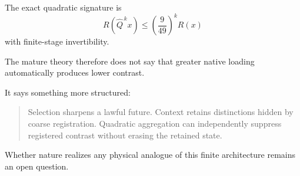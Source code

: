 The exact quadratic signature is
\[
R(\widehat Q^{\,k}x)
\le
\left(\frac9{49}\right)^kR(x)
\]
with finite-stage invertibility.

The mature theory therefore does not say that greater native loading
automatically produces lower contrast.

It says something more structured:

\begin{quote}
Selection sharpens a lawful future.
Context retains distinctions hidden by coarse registration.
Quadratic aggregation can independently suppress registered contrast
without erasing the retained state.
\end{quote}

Whether nature realizes any physical analogue of this finite
architecture remains an open question.
